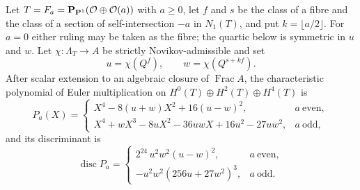 \begin{lemma}
\label{lem:hirzebruch-euler-spectrum}
%
%
%
%
Let \(T=F_a=\mathbf P_{\mathbf P^1}(\mathcal O\oplus\mathcal O(a))\) with \(a\ge0\), let \(f\) and \(s\) be
the class of a fibre and the class of a section of self-intersection \(-a\) in
\(N_1(T)\), and put \(k=\lfloor a/2\rfloor\).  For \(a=0\) either ruling may be
taken as the fibre; the quartic below is symmetric in \(u\) and \(w\).  Let
\(\chi:\Lambda_T\to A\) be strictly
Novikov-admissible and set
\[
 u=\chi(Q^f),\qquad w=\chi(Q^{s+kf}).
\]
After scalar extension to an algebraic closure of \(\operatorname{Frac}A\), the
characteristic polynomial of Euler multiplication on
\(H^0(T)\oplus H^2(T)\oplus H^4(T)\) is
\[
 P_a(X)=
 \begin{cases}
  X^4-8(u+w)X^2+16(u-w)^2, & a\ \text{even},\\[2pt]
  X^4+wX^3-8uX^2-36uwX+16u^2-27uw^2, & a\ \text{odd},
 \end{cases}
 \label{eq:ruled-euler-quartic}
\]
and its discriminant is
\[
 \operatorname{disc}P_a=
 \begin{cases}
  2^{24}\,u^2w^2(u-w)^2, & a\ \text{even},\\[2pt]
  -u^2w^2\left(256u+27w^2\right)^3, & a\ \text{odd}.
 \end{cases}
 \label{eq:ruled-euler-discriminant}
\]
\end{lemma}

